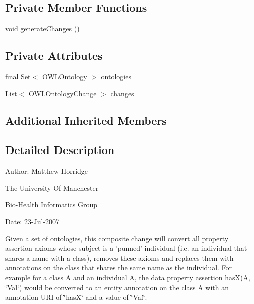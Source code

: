 \subsection*{Private Member Functions}
\begin{DoxyCompactItemize}
\item 
void \hyperlink{classorg_1_1semanticweb_1_1owlapi_1_1_convert_property_assertions_to_annotations_af8d29fa44899365bcf3f9a57aa5c341d}{generate\-Changes} ()
\end{DoxyCompactItemize}
\subsection*{Private Attributes}
\begin{DoxyCompactItemize}
\item 
final Set$<$ \hyperlink{interfaceorg_1_1semanticweb_1_1owlapi_1_1model_1_1_o_w_l_ontology}{O\-W\-L\-Ontology} $>$ \hyperlink{classorg_1_1semanticweb_1_1owlapi_1_1_convert_property_assertions_to_annotations_aefff3119363370dbba8d0019cd449ce6}{ontologies}
\item 
List$<$ \hyperlink{classorg_1_1semanticweb_1_1owlapi_1_1model_1_1_o_w_l_ontology_change}{O\-W\-L\-Ontology\-Change} $>$ \hyperlink{classorg_1_1semanticweb_1_1owlapi_1_1_convert_property_assertions_to_annotations_a730c4ead4538d218122f2b6ddeae762f}{changes}
\end{DoxyCompactItemize}
\subsection*{Additional Inherited Members}


\subsection{Detailed Description}
Author\-: Matthew Horridge\par
 The University Of Manchester\par
 Bio-\/\-Health Informatics Group\par
 Date\-: 23-\/\-Jul-\/2007\par
\par
 

Given a set of ontologies, this composite change will convert all property assertion axioms whose subject is a 'punned' individual (i.\-e. an individual that shares a name with a class), removes these axioms and replaces them with annotations on the class that shares the same name as the individual. For example for a class A and an individual A, the data property assertion has\-X(A, \char`\"{}\-Val\char`\"{}) would be converted to an entity annotation on the class A with an annotation U\-R\-I of \char`\"{}has\-X\char`\"{} and a value of \char`\"{}\-Val\char`\"{}. 

